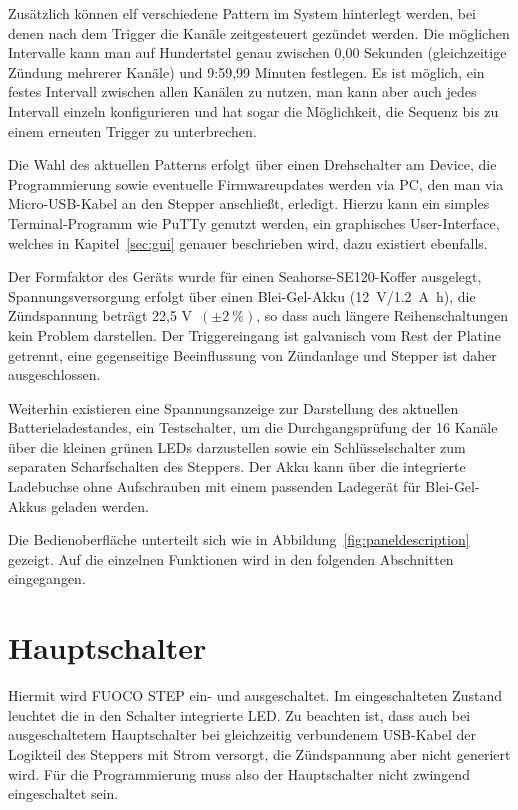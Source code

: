 \documentclass[paper=a4, open=any, numbers=noenddot]{scrbook}
\begin{document}
		Zusätzlich können elf verschiedene Pattern im System hinterlegt werden, bei denen nach dem Trigger die Kanäle zeitgesteuert gezündet werden. Die möglichen Intervalle kann man auf Hundertstel genau zwischen 0,00 Sekunden (gleichzeitige Zündung mehrerer Kanäle) und 9:59,99 Minuten festlegen. Es ist möglich, ein festes Intervall zwischen allen Kanälen zu nutzen, man kann aber auch jedes Intervall einzeln konfigurieren und hat sogar die Möglichkeit, die Sequenz bis zu einem erneuten Trigger zu unterbrechen.

		Die Wahl des aktuellen Patterns erfolgt über einen Drehschalter am Device, die Programmierung sowie eventuelle Firmwareupdates werden via PC, den man via Micro-USB-Kabel an den Stepper anschließt, erledigt. Hierzu kann ein simples Terminal-Programm wie PuTTy genutzt werden, ein graphisches User-Interface, welches in Kapitel~\ref{sec:gui} genauer beschrieben wird, dazu existiert ebenfalls.

		Der Formfaktor des Geräts wurde für einen Seahorse-SE120-Koffer ausgelegt, Spannungsversorgung erfolgt über einen Blei-Gel-Akku (\SI{12}{\volt}/\SI{1,2}{\ampere\hour}), die Zündspannung beträgt 22,5 V~$(\pm\SI{2}{\percent})$, so dass auch längere Reihenschaltungen kein Problem darstellen. Der Triggereingang ist galvanisch vom Rest der Platine getrennt, eine gegenseitige Beeinflussung von Zündanlage und Stepper ist daher ausgeschlossen.

		Weiterhin existieren eine Spannungsanzeige zur Darstellung des aktuellen Batterieladestandes, ein Testschalter, um die Durchgangsprüfung der 16 Kanäle über die kleinen grünen LEDs darzustellen sowie ein Schlüsselschalter zum separaten Scharfschalten des Steppers. Der Akku kann über die integrierte Ladebuchse ohne Aufschrauben mit einem passenden Ladegerät für Blei-Gel-Akkus geladen werden.

		Die Bedienoberfläche unterteilt sich wie in Abbildung~\ref{fig:paneldescription} gezeigt. Auf die einzelnen Funktionen wird in den folgenden Abschnitten eingegangen.

		\section{Hauptschalter}

			Hiermit wird FUOCO STEP ein- und ausgeschaltet. Im eingeschalteten Zustand leuchtet die in den Schalter integrierte LED. Zu beachten ist, dass auch bei ausgeschaltetem Hauptschalter bei gleichzeitig verbundenem USB-Kabel der Logikteil des Steppers mit Strom versorgt, die Zündspannung aber nicht generiert wird. Für die Programmierung muss also der Hauptschalter nicht zwingend eingeschaltet sein.
\end{document}
